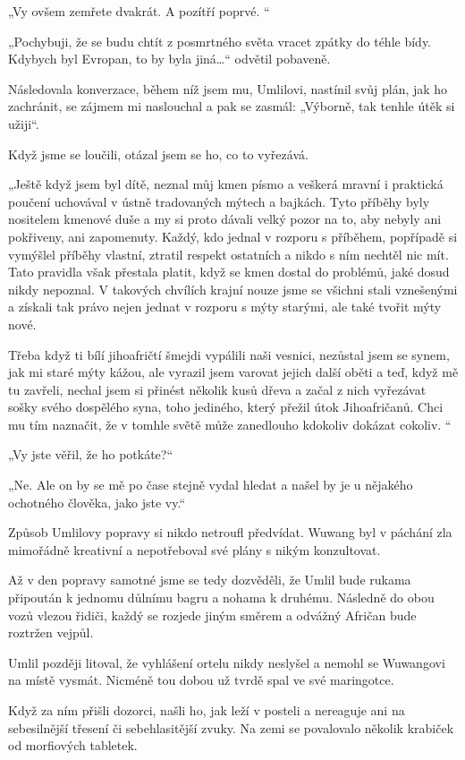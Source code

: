  „Vy ovšem zemřete dvakrát. A pozítří poprvé. “
	
 „Pochybuji, že se budu chtít z posmrtného světa vracet zpátky do téhle bídy. Kdybych byl Evropan, to by byla jiná…“ odvětil pobaveně.

Následovala konverzace, během níž jsem mu, Umlilovi, nastínil svůj plán, jak ho zachránit, se zájmem mi naslouchal a pak se zasmál: „Výborně, tak tenhle útěk si užiji“.
	
 Když jsme se loučili, otázal jsem se ho, co to vyřezává.
	
 „Ještě když jsem byl dítě, neznal můj kmen písmo a veškerá mravní i praktická poučení uchovával v ústně tradovaných mýtech a bajkách. Tyto příběhy byly nositelem kmenové duše a my si proto dávali velký pozor na to, aby nebyly ani pokřiveny, ani zapomenuty. Každý, kdo jednal v rozporu s příběhem, popřípadě si vymýšlel příběhy vlastní, ztratil respekt ostatních a nikdo s ním nechtěl nic mít. Tato pravidla však přestala platit, když se kmen dostal do problémů, jaké dosud nikdy nepoznal. V takových chvílích krajní nouze jsme se všichni stali vznešenými a získali tak právo nejen jednat v rozporu s mýty starými, ale také tvořit mýty nové.  

Třeba když ti bílí jihoafričtí šmejdi vypálili naši vesnici, nezůstal jsem se synem, jak mi staré mýty kážou, ale vyrazil jsem varovat jejich další oběti a teď, když mě tu zavřeli, nechal jsem si přinést několik kusů dřeva a začal z nich vyřezávat sošky svého dospělého syna, toho jediného, který přežil útok Jihoafričanů. Chci mu tím naznačit, že v tomhle světě může zanedlouho kdokoliv dokázat cokoliv. “

„Vy jste věřil, že ho potkáte?“

„Ne. Ale on by se mě po čase stejně vydal hledat a našel by je u nějakého ochotného člověka, jako jste vy.“

Způsob Umlilovy popravy si nikdo netroufl předvídat. Wuwang byl v páchání zla mimořádně kreativní a nepotřeboval své plány s nikým konzultovat. 
	
 Až v den popravy samotné jsme se tedy dozvěděli, že Umlil bude rukama připoután k jednomu důlnímu bagru a nohama k druhému. Následně do obou vozů vlezou řidiči, každý se rozjede jiným směrem a odvážný Afričan bude roztržen vejpůl.
	
 Umlil později litoval, že vyhlášení ortelu nikdy neslyšel a nemohl se Wuwangovi na místě vysmát. Nicméně tou dobou už tvrdě spal ve své maringotce.
	
 Když za ním přišli dozorci, našli ho, jak leží v posteli a nereaguje ani na sebesilnější třesení či sebehlasitější zvuky. Na zemi se povalovalo několik krabiček od morfiových tabletek.
	
